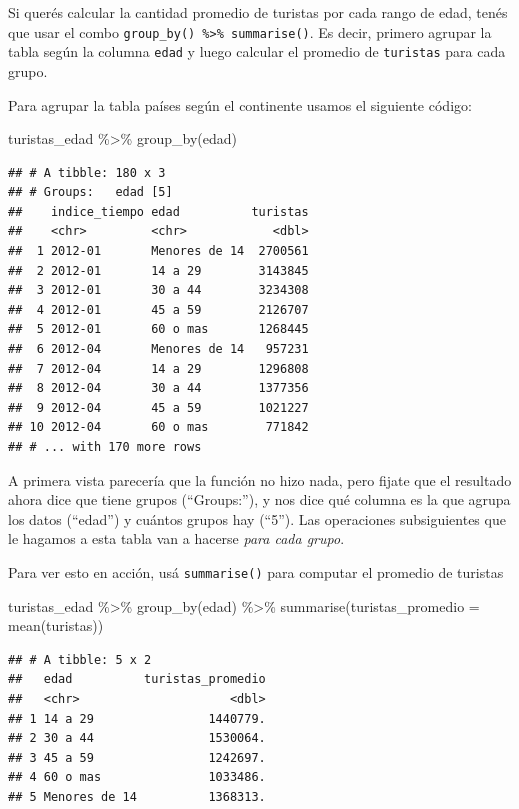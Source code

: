 \documentclass[
  openany]{book}
\newenvironment{Shaded}{\begin{snugshade}}{\end{snugshade}}
\newcommand{\AttributeTok}[1]{\textcolor[rgb]{0.77,0.63,0.00}{#1}}
\newcommand{\FunctionTok}[1]{\textcolor[rgb]{0.00,0.00,0.00}{#1}}
\newcommand{\NormalTok}[1]{#1}
\newcommand{\SpecialCharTok}[1]{\textcolor[rgb]{0.00,0.00,0.00}{#1}}
\begin{document}
Si querés calcular la cantidad promedio de turistas por cada rango de edad, tenés que usar el combo \texttt{group\_by()\ \%\textgreater{}\%\ summarise()}.
Es decir, primero agrupar la tabla según la columna \texttt{edad} y luego calcular el promedio de \texttt{turistas} para cada grupo.

Para agrupar la tabla países según el continente usamos el siguiente código:

\begin{Shaded}
\begin{Highlighting}[]
\NormalTok{turistas\_edad }\SpecialCharTok{\%\textgreater{}\%} 
  \FunctionTok{group\_by}\NormalTok{(edad) }
\end{Highlighting}
\end{Shaded}

\begin{verbatim}
## # A tibble: 180 x 3
## # Groups:   edad [5]
##    indice_tiempo edad          turistas
##    <chr>         <chr>            <dbl>
##  1 2012-01       Menores de 14  2700561
##  2 2012-01       14 a 29        3143845
##  3 2012-01       30 a 44        3234308
##  4 2012-01       45 a 59        2126707
##  5 2012-01       60 o mas       1268445
##  6 2012-04       Menores de 14   957231
##  7 2012-04       14 a 29        1296808
##  8 2012-04       30 a 44        1377356
##  9 2012-04       45 a 59        1021227
## 10 2012-04       60 o mas        771842
## # ... with 170 more rows
\end{verbatim}

A primera vista parecería que la función no hizo nada, pero fijate que el resultado ahora dice que tiene grupos (``Groups:''), y nos dice qué columna es la que agrupa los datos (``edad'') y cuántos grupos hay (``5'').
Las operaciones subsiguientes que le hagamos a esta tabla van a hacerse \emph{para cada grupo}.

Para ver esto en acción, usá \texttt{summarise()} para computar el promedio de turistas

\begin{Shaded}
\begin{Highlighting}[]
\NormalTok{turistas\_edad }\SpecialCharTok{\%\textgreater{}\%} 
  \FunctionTok{group\_by}\NormalTok{(edad) }\SpecialCharTok{\%\textgreater{}\%} 
  \FunctionTok{summarise}\NormalTok{(}\AttributeTok{turistas\_promedio =} \FunctionTok{mean}\NormalTok{(turistas))}
\end{Highlighting}
\end{Shaded}

\begin{verbatim}
## # A tibble: 5 x 2
##   edad          turistas_promedio
##   <chr>                     <dbl>
## 1 14 a 29                1440779.
## 2 30 a 44                1530064.
## 3 45 a 59                1242697.
## 4 60 o mas               1033486.
## 5 Menores de 14          1368313.
\end{verbatim}
\end{document}
